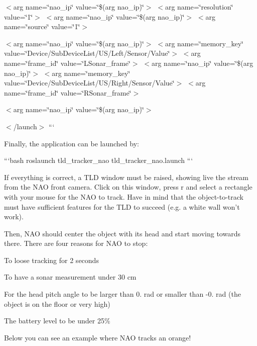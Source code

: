$<$arg name=\char`\"{}nao\-\_\-ip\char`\"{} value=\char`\"{}\$(arg nao\-\_\-ip)\char`\"{}$>$ $<$arg name=\char`\"{}resolution\char`\"{} value=\char`\"{}1\char`\"{}$>$   $<$arg name=\char`\"{}nao\-\_\-ip\char`\"{} value=\char`\"{}\$(arg nao\-\_\-ip)\char`\"{}$>$ $<$arg name=\char`\"{}source\char`\"{} value=\char`\"{}1\char`\"{}$>$ 

$<$arg name=\char`\"{}nao\-\_\-ip\char`\"{} value=\char`\"{}\$(arg nao\-\_\-ip)\char`\"{}$>$ $<$arg name=\char`\"{}memory\-\_\-key\char`\"{} value=\char`\"{}\-Device/\-Sub\-Device\-List/\-U\-S/\-Left/\-Sensor/\-Value\char`\"{}$>$ $<$arg name=\char`\"{}frame\-\_\-id\char`\"{} value=\char`\"{}\-L\-Sonar\-\_\-frame\char`\"{}$>$   $<$arg name=\char`\"{}nao\-\_\-ip\char`\"{} value=\char`\"{}\$(arg nao\-\_\-ip)\char`\"{}$>$ $<$arg name=\char`\"{}memory\-\_\-key\char`\"{} value=\char`\"{}\-Device/\-Sub\-Device\-List/\-U\-S/\-Right/\-Sensor/\-Value\char`\"{}$>$ $<$arg name=\char`\"{}frame\-\_\-id\char`\"{} value=\char`\"{}\-R\-Sonar\-\_\-frame\char`\"{}$>$ 

$<$arg name=\char`\"{}nao\-\_\-ip\char`\"{} value=\char`\"{}\$(arg nao\-\_\-ip)\char`\"{}$>$ 

$<$/launch$>$ ```

Finally, the application can be launched by\-:

```bash roslaunch tld\-\_\-tracker\-\_\-nao tld\-\_\-tracker\-\_\-nao.\-launch ```

If everything is correct, a T\-L\-D window must be raised, showing live the stream from the N\-A\-O front camera. Click on this window, press {\ttfamily r} and select a rectangle with your mouse for the N\-A\-O to track. Have in mind that the object-\/to-\/track must have sufficient features for the T\-L\-D to succeed (e.\-g. a white wall won't work).

Then, N\-A\-O should center the object with its head and start moving towards there. There are four reasons for N\-A\-O to stop\-:
\begin{DoxyItemize}
\item To loose tracking for 2 seconds
\item To have a sonar measurement under 30 cm
\item For the head pitch angle to be larger than 0. rad or smaller than -\/0. rad (the object is on the floor or very high)
\item The battery level to be under 25\%
\end{DoxyItemize}

Below you can see an example where N\-A\-O tracks an orange!

 